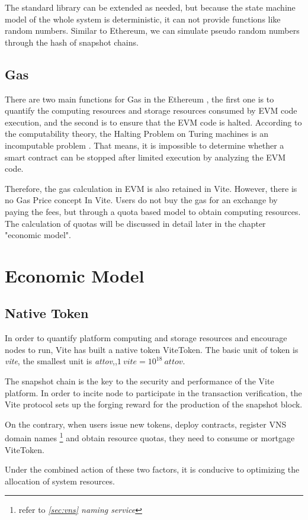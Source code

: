 \documentclass[UTF8,nofonts]{article}
\begin{document}
\begin{multicols}{2}
The standard library can be extended as needed, but because the state machine model of the whole system is deterministic, it can not provide functions like random numbers. Similar to Ethereum, we can simulate pseudo random numbers through the hash of snapshot chains.

\subsection{Gas}
There are two main functions for Gas in the Ethereum , the first one is to quantify the computing resources and storage resources consumed by EVM code execution, and the second is to ensure that the EVM code is halted. According to the computability theory, the Halting Problem on Turing machines is an incomputable problem \cite{haltingproblems}. That means, it is impossible to determine whether a smart contract can be stopped after limited execution by analyzing the EVM code.

Therefore, the gas calculation in EVM is also retained in Vite. However, there is no Gas Price concept In Vite. Users do not buy the gas for an exchange by paying the fees, but through a quota based model to obtain computing resources. The calculation of quotas will be discussed in detail later in the chapter "economic model".

\section{Economic Model}
\subsection{Native Token}
In order to quantify platform computing and storage resources and encourage nodes to run, Vite has built a native token ViteToken. The basic unit of token is \textit{vite}, the smallest unit is \textit{attov},,$1 \: vite = 10^{18} \: attov$.

The snapshot chain is the key to the security and performance of the Vite platform. In order to incite node to participate in the transaction verification, the Vite protocol sets up the forging reward for the production of the snapshot block.

On the contrary, when users issue new tokens, deploy contracts, register VNS domain names \footnote{refer to  \textit{\ref{sec:vns} naming service}} and obtain resource quotas, they need to consume or mortgage ViteToken.

Under the combined action of these two factors, it is conducive to optimizing the allocation of system resources.


\end{multicols}
\end{document}
